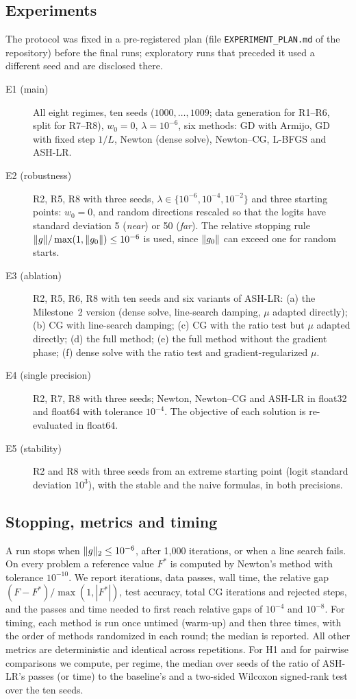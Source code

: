 \subsection{Experiments}
The protocol was fixed in a pre-registered plan (file \texttt{EXPERIMENT\_PLAN.md}
of the repository) before the final runs; exploratory runs that preceded it used a
different seed and are disclosed there.
\begin{description}
\item[E1 (main)] All eight regimes, ten seeds ($1000,\dots,1009$; data generation
for R1--R6, split for R7--R8), $w_0=0$, $\lambda=10^{-6}$, six methods: GD with
Armijo, GD with fixed step $1/L$, Newton (dense solve), Newton--CG, L-BFGS and ASH-LR.
\item[E2 (robustness)] R2, R5, R8 with three seeds, $\lambda\in\{10^{-6},10^{-4},10^{-2}\}$
and three starting points: $w_0=0$, and random directions rescaled so that the
logits have standard deviation 5 (\emph{near}) or 50 (\emph{far}). The relative
stopping rule $\lVert g\rVert/\max(1,\lVert g_0\rVert)\le10^{-6}$ is used, since $\lVert g_0\rVert$ can
exceed one for random starts.
\item[E3 (ablation)] R2, R5, R6, R8 with ten seeds and six variants of ASH-LR:
(a) the Milestone~2 version (dense solve, line-search damping, $\mu$ adapted directly);
(b) CG with line-search damping; (c) CG with the ratio test but $\mu$ adapted
directly; (d) the full method; (e) the full method without the gradient phase;
(f) dense solve with the ratio test and gradient-regularized $\mu$.
\item[E4 (single precision)] R2, R7, R8 with three seeds; Newton, Newton--CG and
ASH-LR in float32 and float64 with tolerance $10^{-4}$. The objective of each
solution is re-evaluated in float64.
\item[E5 (stability)] R2 and R8 with three seeds from an extreme starting point
(logit standard deviation $10^3$), with the stable and the naive formulas, in both
precisions.
\end{description}

\subsection{Stopping, metrics and timing}
A run stops when $\lVert g\rVert_2\le10^{-6}$, after 1,000 iterations, or when a line search
fails. On every problem a reference value $F^*$ is computed by Newton's method with
tolerance $10^{-10}$. We report iterations, data passes, wall time, the relative gap
$(F-F^*)/\max(1,|F^*|)$, test accuracy, total CG iterations and rejected steps, and
the passes and time needed to first reach relative gaps of $10^{-4}$ and $10^{-8}$.
For timing, each method is run once untimed (warm-up) and then three times, with the
order of methods randomized in each round; the median is reported. All other
metrics are deterministic and identical across repetitions. For H1 and for pairwise
comparisons we compute, per regime, the median over seeds of the ratio of ASH-LR's
passes (or time) to the baseline's and a two-sided Wilcoxon signed-rank test over
the ten seeds.

